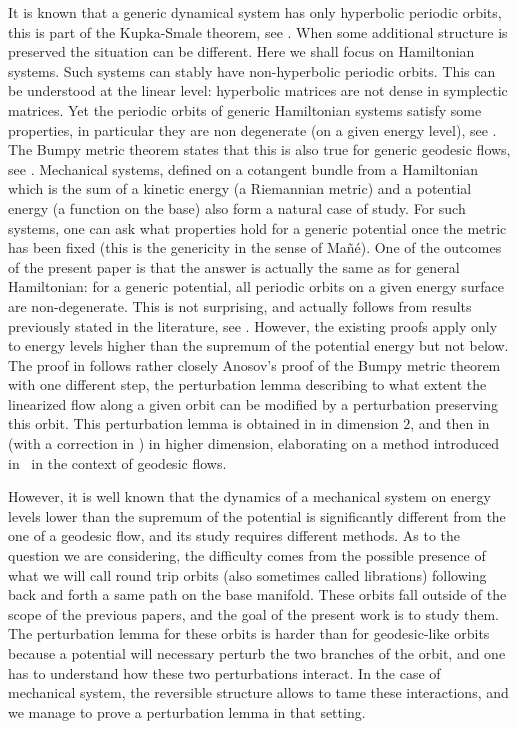 It is known that a generic dynamical system has only hyperbolic periodic orbits, this is part of the Kupka-Smale theorem, see
\cite{K63,S63}. When some additional structure is preserved the situation can be different. Here we shall focus on Hamiltonian systems.
Such systems can stably have non-hyperbolic periodic orbits.
This can be understood at the linear level: hyperbolic matrices are not dense in symplectic matrices.
Yet the periodic orbits of generic Hamiltonian systems satisfy some properties, in particular they are non degenerate (on a given energy level), see \cite{CR1,CR2}. The Bumpy metric theorem states that this is also true for generic geodesic flows, see \cite{A68,A82}.
Mechanical systems, defined on a cotangent bundle from a Hamiltonian
which is the sum of a kinetic energy (a Riemannian metric) and a potential energy (a function on the base)
also form a natural case of study.
For such systems, one can ask what properties hold for a generic potential once the metric has been fixed
(this is the genericity in the sense of Mañé).
One of the outcomes of the present paper is that the answer is actually the same as for general Hamiltonian: for a generic potential, all periodic orbits on a given energy surface are non-degenerate.
This is not surprising, and actually follows from results previously stated in the literature, see \cite{O08,RR}.
However, the existing proofs apply only to energy levels higher than the supremum of the potential energy but not below.
The proof in \cite{O08} follows rather closely Anosov's proof of the Bumpy metric theorem
with one different step, the perturbation lemma describing to what extent the linearized flow along a given orbit can be modified by a perturbation preserving this orbit. This perturbation lemma is obtained in \cite{O08} in dimension $2$, and then in \cite{RR}
(with a correction in \cite{AB}) in higher dimension, elaborating on
a method introduced in~\cite{Co10} in the context of geodesic flows.

However, it is well known that the dynamics of a mechanical system on energy levels lower than the supremum of the potential is
significantly different from the one of a geodesic flow, and its study requires different methods. As to the question we are considering, the difficulty comes from the possible presence of what we will call round trip orbits (also sometimes called librations)
following back and forth a same path on the base manifold.
These orbits fall outside of the scope of the previous papers,
and the goal of the present work is to study them.
The perturbation lemma for these orbits is harder than for geodesic-like orbits because
a potential will necessary perturb the two branches of the orbit, and one has to understand how these two perturbations interact.
In the case of mechanical system, the reversible structure allows to tame these interactions, and we manage to prove a perturbation lemma in that setting.

